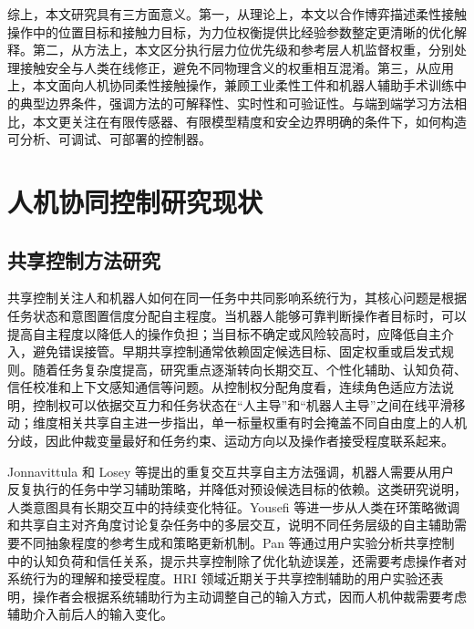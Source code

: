 综上，本文研究具有三方面意义。第一，从理论上，本文以合作博弈描述柔性接触操作中的位置目标和接触力目标，为力位权衡提供比经验参数整定更清晰的优化解释。第二，从方法上，本文区分执行层力位优先级和参考层人机监督权重，分别处理接触安全与人类在线修正，避免不同物理含义的权重相互混淆。第三，从应用上，本文面向人机协同柔性接触操作，兼顾工业柔性工件和机器人辅助手术训练中的典型边界条件，强调方法的可解释性、实时性和可验证性。与端到端学习方法相比，本文更关注在有限传感器、有限模型精度和安全边界明确的条件下，如何构造可分析、可调试、可部署的控制器。

\section{人机协同控制研究现状}
\label{sec:ch1_related_work}

\subsection{共享控制方法研究}
\label{subsec:ch1_shared_autonomy}

共享控制关注人和机器人如何在同一任务中共同影响系统行为，其核心问题是根据任务状态和意图置信度分配自主程度。当机器人能够可靠判断操作者目标时，可以提高自主程度以降低人的操作负担；当目标不确定或风险较高时，应降低自主介入，避免错误接管。早期共享控制通常依赖固定候选目标、固定权重或启发式规则。随着任务复杂度提高，研究重点逐渐转向长期交互、个性化辅助、认知负荷、信任校准和上下文感知通信等问题\cite{matsumoto2022shared,li2023trust,pan2024effects,luo2024customizable}。从控制权分配角度看，连续角色适应方法说明，控制权可以依据交互力和任务状态在“人主导”和“机器人主导”之间在线平滑移动\cite{li2015continuousrole}；维度相关共享自主进一步指出，单一标量权重有时会掩盖不同自由度上的人机分歧，因此仲裁变量最好和任务约束、运动方向以及操作者接受程度联系起来\cite{bowman2023dimensionspecific}。

Jonnavittula 和 Losey 等提出的重复交互共享自主方法强调，机器人需要从用户反复执行的任务中学习辅助策略，并降低对预设候选目标的依赖\cite{jonnavittula2021learning,jonnavittula2022sari}。这类研究说明，人类意图具有长期交互中的持续变化特征。Yousefi 等进一步从人类在环策略微调和共享自主对齐角度讨论复杂任务中的多层交互，说明不同任务层级的自主辅助需要不同抽象程度的参考生成和策略更新机制\cite{yousefi2025sharedautonomy}。Pan 等通过用户实验分析共享控制中的认知负荷和信任关系，提示共享控制除了优化轨迹误差，还需要考虑操作者对系统行为的理解和接受程度\cite{pan2024effects}。HRI 领域近期关于共享控制辅助的用户实验还表明，操作者会根据系统辅助行为主动调整自己的输入方式，因而人机仲裁需要考虑辅助介入前后人的输入变化\cite{aronson2024intentional}。

